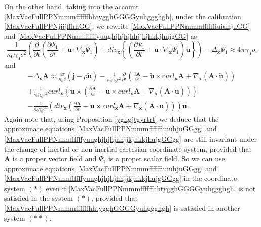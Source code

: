 \documentclass{article}
\theoremstyle{definition}
\theoremstyle{remark}
\renewcommand{\vec}[1]{\mathbf{#1}}
\newcommand{\er}{\eqref}
\newcommand{\er}{\eqref}
\begin{document}
On the other hand, taking into the account
\er{MaxVacFullPPNmmmffffffhhtygghGGGGyuhggghgh}, under the
calibration \er{MaxVacFullPPNjjjjffhhGG}, we rewrite
\er{MaxVacFullPPNmmmffffffiuiuhjuGG} and
\er{MaxVacFullPPNnnnffffffyuughjhjhjhhjjkjhkkjhujgGG} as
\begin{equation}\label{MaxVacFullPPNmmmffffffiuiuhjuGGgg}
\frac{1}{\kappa_0\gamma_0 c^2}\left(\frac{\partial}{\partial
t}\left(\frac{\partial\Psi_1}{\partial t}+\vec {\tilde
u}\cdot\nabla_{\vec x}\Psi_1\right)+div_{\vec x}
\left\{\left(\frac{\partial\Psi_1}{\partial t}+\vec {\tilde
u}\cdot\nabla_{\vec x}\Psi_1\right)\vec {\tilde
u}\right\}\right)-\Delta_{\vec x}\Psi_1\approx 4\pi\gamma_0\rho.
\end{equation}
and
\begin{multline}\label{MaxVacFullPPNnnnffffffyuughjhjhjhhjjkjhkkjhujgGGgg}
-\Delta_{\vec x}\vec A\approx \frac{4\pi}{\kappa_0 c}\left(\vec
j-\rho\vec {\tilde u}\right)-\frac{1}{\kappa_0\gamma_0
c^2}\frac{\partial}{\partial t}\left(\frac{\partial\vec A}{\partial
t}-\vec {\tilde u}\times curl_{\vec x}\vec A+\nabla_{\vec
x}\left(\vec A\cdot\vec {\tilde
u}\right)\right)\\+\frac{1}{\kappa_0\gamma_0 c^2}curl_{\vec x}
\left\{\vec {\tilde u}\times
\left(\frac{\partial\vec A}{\partial t}-\vec {\tilde u}\times
curl_{\vec x}\vec A+\nabla_{\vec x}\left(\vec A\cdot\vec {\tilde
u}\right)\right)\right\}\\-\frac{1}{\kappa_0\gamma_0
c^2}\left(div_{\vec x}\left(\frac{\partial\vec A}{\partial t}-\vec
{\tilde u}\times curl_{\vec x}\vec A+\nabla_{\vec x}\left(\vec
A\cdot\vec {\tilde u}\right)\right)\right)\vec {\tilde u}.
\end{multline}
Again note that, using Proposition \ref{yghgjtgyrtrt} we deduce that
the approximate equations \er{MaxVacFullPPNmmmffffffiuiuhjuGGgg} and
\er{MaxVacFullPPNnnnffffffyuughjhjhjhhjjkjhkkjhujgGGgg} are still
invariant under the change of inertial or non-inertial cartesian
coordinate system, provided that $\vec A$ is a proper vector field
and $\Psi_1$ is a proper scalar field. So we can use approximate
equations \er{MaxVacFullPPNmmmffffffiuiuhjuGGgg} and
\er{MaxVacFullPPNnnnffffffyuughjhjhjhhjjkjhkkjhujgGGgg} in the
coordinate system $(*)$ even if
\er{MaxVacFullPPNmmmffffffhhtygghGGGGyuhggghgh} is not satisfied in
the system $(*)$, provided that
\er{MaxVacFullPPNmmmffffffhhtygghGGGGyuhggghgh} is satisfied in
another system $(**)$.
\end{document}
